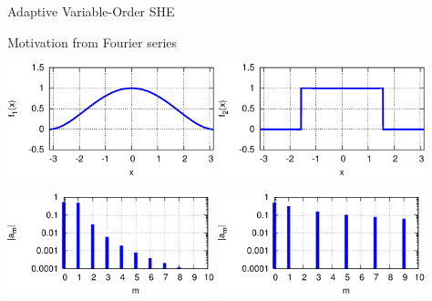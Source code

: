 \documentclass[usepdftitle=false,10pt]{beamer}
\begin{document}
\begin{frame}{Adaptive Variable-Order SHE}
  
 \begin{block}{Motivation from Fourier series}

  \vspace*{0.6cm}
  \begin{minipage}{0.97\textwidth}
    \includegraphics[width=0.45\textwidth]{fourier_f1} \hspace*{0.25cm}
    \includegraphics[width=0.45\textwidth]{fourier_f2} \hspace*{0.25cm} \newline

    \includegraphics[width=0.45\textwidth]{fourier_coeff_1}\hspace*{0.25cm}
    \includegraphics[width=0.45\textwidth]{fourier_coeff_2}
  \end{minipage}
 \end{block}

\end{frame}
\end{document}
